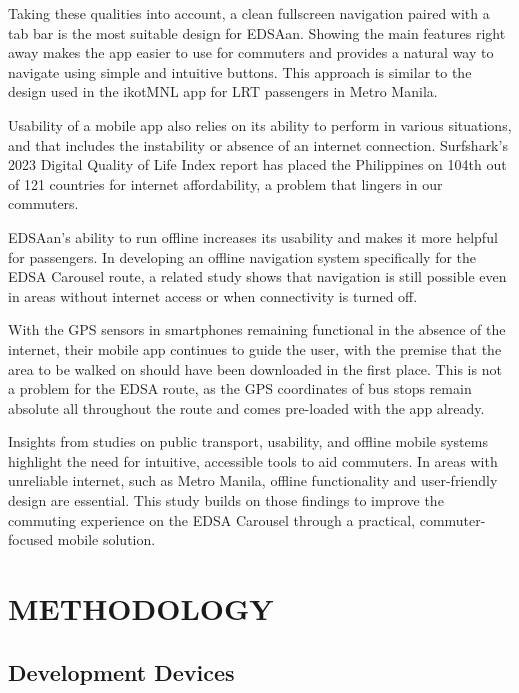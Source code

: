 \documentclass{icsthesis}
\begin{document}
\begin{mainmatter}
Taking these qualities into account, a clean fullscreen navigation paired with a tab bar is the most suitable design for EDSAan. Showing the main features right away makes the app easier to use for commuters and provides a natural way to navigate using simple and intuitive buttons. This approach is similar to the design used in the ikotMNL app for LRT passengers \citep{Ref:008} in Metro Manila.

Usability of a mobile app also relies on its ability to perform in various situations, and that includes the instability or absence of an internet connection. Surfshark’s 2023 Digital Quality of Life Index report \citep{Ref:016} has placed the Philippines on 104th out of 121 countries for internet affordability, a problem that lingers in our commuters.

EDSAan’s ability to run offline increases its usability and makes it more helpful for passengers. In developing an offline navigation system specifically for the EDSA Carousel route, a related study \citep{Ref:014} shows that navigation is still possible even in areas without internet access or when connectivity is turned off.

With the GPS sensors in smartphones remaining functional in the absence of the internet, their mobile app continues to guide the user, with the premise that the area to be walked on should have been downloaded in the first place. This is not a problem for the EDSA route, as the GPS coordinates of bus stops remain absolute all throughout the route and comes pre-loaded with the app already.

Insights from studies on public transport, usability, and offline mobile systems highlight the need for intuitive, accessible tools to aid commuters. In areas with unreliable internet, such as Metro Manila, offline functionality and user-friendly design are essential. This study builds on those findings to improve the commuting experience on the EDSA Carousel through a practical, commuter-focused mobile solution.
				
		
		\section{METHODOLOGY}

\subsection{Development Devices}


\end{mainmatter}
\end{document}
